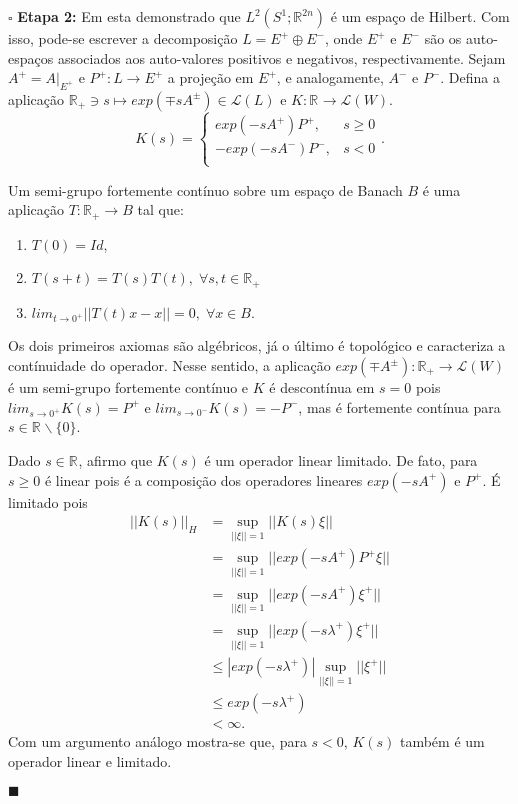 \documentclass[12pt]{book}
\newenvironment{prova}[1]{$\square$ #1}{\hfill$\blacksquare$}
\newcommand{\circulo}{S^{1}}
\newcommand{\espacoLdois}[1]{L^{2}(#1)}
\newcommand{\funcaocond}[5]{
	#1 = 
	\left\{
	\begin{array}{cc}
		#2, & #3\\
		#4, & #5\\
	\end{array}
	\right.
}
\newcommand{\norma}[1]{||#1||}
\newcommand{\real}[1]{\mathbb{R}^{#1}}
\newcommand{\vermelho}[1]{{\color{red}#1}}
\begin{document}
\begin{prova}
		\textbf{Etapa 2:} Em \cite{kreyszig_analise_funcional} esta demonstrado que $ \espacoLdois{\circulo;\real{2n}}$ é um espaço de Hilbert. Com isso, pode-se escrever a decomposição $L=E^{+}\oplus E^{-}$, onde $E^{+}$ e $E^{-}$ são os auto-espaços associados aos auto-valores positivos e negativos, respectivamente. Sejam $A^{+}=A |_{E^{+}}$ e $P^{+}: L \to E^{+}$ a projeção em $E^{+}$, e analogamente, $A^{-}$ e $P^{-}$. Defina a aplicação $\real{}_{+} \ni s \mapsto exp(\mp s A^{\pm}) \in \mathcal{L}(L)$ e $K: \real{}\to \mathcal{L}(W)$.
		$$
		\funcaocond{K(s)}{exp(-s A^{+})P^{+}}{s \geq 0}{-exp(-s 	A^{-})P^{-}}{s<0}.
		$$
		\vermelho{
			Um semi-grupo fortemente contínuo sobre um espaço de Banach $B$ é uma aplicação $T:\real{}_{+}\to B$ tal que:
			
			\begin{enumerate}
				\item $T(0) = Id$,
				\item $T(s+t) = T(s)T(t), \;\forall s, t \in \real{}_{+}$
				\item $lim_{t \to 0^{+}}\norma{T(t)x - x } = 0, \; \forall x \in B $.
			\end{enumerate}
			Os dois primeiros  axiomas são algébricos, já o último é topológico e caracteriza a contínuidade do operador. Nesse sentido, a aplicação $exp(\mp A^{\pm}):\real{}_{+} \to \mathcal{L}(W)$ é um semi-grupo fortemente contínuo e $K$ é descontínua em $s=0$ pois $lim_{s\to 0^{+}}K(s) = P^{+}$ e $lim_{s\to 0^{-}} K(s)= -P^{-}$, mas é fortemente contínua para $s \in \real{}\backslash\{0\}$. 
		}
		
		Dado $s \in \real{}$, afirmo que $K(s)$ é um operador linear limitado. De fato, para $s\geq 0$ é linear pois é a composição dos operadores lineares $exp(- sA^{+})$ e $P^{+}$. É limitado pois
		$$
		\begin{aligned}
		\norma{K(s)}_{H} &= \sup_{\norma{\xi}=1}\norma{K(s)\xi}
		\\
		&=\sup_{\norma{\xi}=1}\norma{ exp(- sA^{+})P^{+}\xi}
		\\
		&=\sup_{\norma{\xi}=1}\norma{exp(- sA^{+})\xi^{+}}
		\\
		&=\sup_{\norma{\xi}=1}\norma{exp(- s\lambda^{+})\xi^{+}}
		\\
		&\leq |exp(- s\lambda^{+})|\sup_{\norma{\xi}=1}\norma{\xi^{+}}
		\\
		&\leq exp(- s\lambda^{+})
		\\
		&< \infty.
		\end{aligned}
		$$
		Com um argumento análogo mostra-se que, para $s<0$, $K(s)$ também é um operador linear e limitado.
		 

\end{prova}
\end{document}
